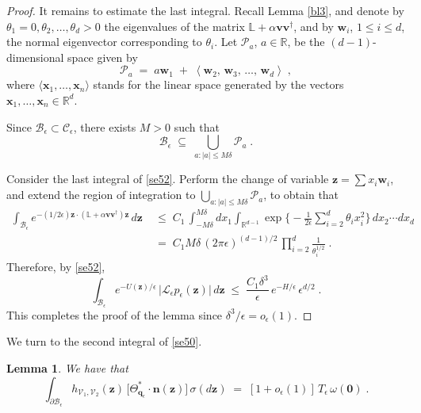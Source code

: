\documentclass[reqno]{amsart}
\newtheorem{lemma}[theorem]{Lemma}
\newcounter{as}[section]
\newcommand{\mc}[1]{{\mathcal #1}}
\newcommand{\bb}[1]{{\mathbb #1}}
\newcommand{\bs}[1]{{\boldsymbol #1}}
\newcommand{\<}{\langle}
\renewcommand{\>}{\rangle}
\begin{document}
\begin{proof}
It remains to estimate the last integral. Recall Lemma \ref{bl3}, and
denote by $\theta_{1}=0, \theta_{2}, \dots, \theta_{d}>0$ the
eigenvalues of the matrix $\bb{L}+\alpha\bs{v}\bs{v}^{\dagger}$, and by
$\bs{w}_{i}$, $1\le i\le d$, the normal eigenvector corresponding to
$\theta_{i}$. Let $\mathscr{P}_{a}$, $a\in\bb{R}$, be the
$(d-1)$-dimensional space given by
\begin{equation*}
\mathscr{P}_{a}\;=\;a\bs{w}_{1} \;+\;
\left\langle \bs{w}_{2},\,\bs{w}_{3},\,\dots,\,\bs{w}_{d}\right\rangle \;,
\end{equation*}
where $\langle \bs{x}_{1},  \dots, \bs{x}_{n}\rangle$ stands for the
linear space generated by the vectors $\bs{x}_{1},  \dots, \bs{x}_{n}
\in \bb R^d$.

Since $\mc{B}_{\epsilon}\subset\mc{C}_{\epsilon}$, there exists $M>0$
such that
\begin{equation*}
\mc{B}_{\epsilon}\;\subseteq\;\bigcup_{a:|a|\le M\delta}\mathscr{P}_{a}\;.
\end{equation*}

Consider the last integral of \eqref{se52}. Perform the change of
variable $\bs{z}=\sum x_{i}\bs{w}_{i}$, and extend the region of
integration to $\bigcup_{a:|a|\le M\delta}\mathscr{P}_{a}$, to obtain
that
\begin{align*}
\int_{\mc{B}_{\epsilon}} e^{-(1/2\epsilon) \bs{z}\cdot
  (\bb{L}+\alpha\bs{v}\bs{v}^{\dagger})\bs{z}} \, d\bs{z}
\; & \le\; C_1 \, \int_{-M\delta}^{M\delta}dx_{1} \int_{\bb{R}^{d-1}}
\exp\Big\{ -\frac{1}{2\epsilon}\sum_{i=2}^{d}\theta_{i}x_{i}^{2}\Big\}
\, dx_{2}\cdots dx_{d} \\
& =\;C_1 M\delta \, (2\pi\epsilon)^{(d-1)/{2}}
\, \prod_{i=2}^{d} \frac 1{\theta_{i}^{1/2}} \; .
\end{align*}
Therefore, by \eqref{se52},
\begin{equation*}
\int_{\mc{B}_{\epsilon}}e^{- U(\bs{z})/\epsilon}\,
\big|\mc{L}_{\epsilon}p_{\epsilon}(\bs{z})\big|\, d\bs{z}
\;\le\;\frac{C_1 \delta^{3}}{\epsilon}\, e^{-H/\epsilon}
\, \epsilon^{d/{2}} \;.
\end{equation*}
This completes the proof of the lemma since
$\delta^{3}/\epsilon=o_{\epsilon}(1)$.
\end{proof}


We turn to the second integral of \eqref{se50}.

\begin{lemma}
\label{pt22}
We have that
\begin{equation*}
\int_{\partial\mc{B}_{\epsilon}}
h_{\mc{V}_{1},\mc{V}_{2}}(\bs{z}) \,
\big[\Theta_{\bs{q}_{\epsilon}}^{*}\cdot\bs{n}(\bs{z})\big]
\, \sigma(d\bs{z})
\;=\;\left[1+o_{\epsilon}(1)\right]\,T_{\epsilon}\,\omega(\bs{0})\;.
\end{equation*}
\end{lemma}
\end{document}
